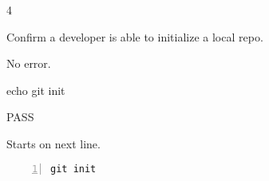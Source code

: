 \begin{description}[align=right,leftmargin=3.2cm,labelindent=3.0cm]
\item[Step:] 4
\item[Confirm:] Confirm a developer is able to initialize a local repo.
\item[Expectation:] No error.
\item[Command:] echo git  init
\item[Test Result:] PASS
\item[Evidence:] Starts on next line.
\end{description}
\begin{lstlisting}[numbers=left]
git init

\end{lstlisting}
